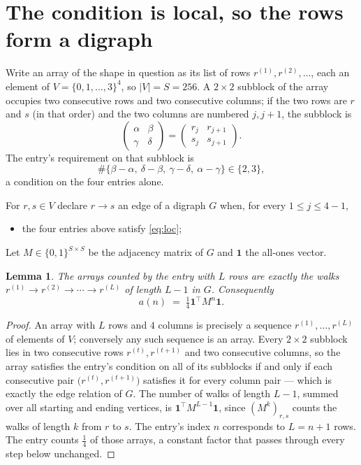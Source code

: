 \documentclass[11pt,a4paper]{article}
\theoremstyle{plain}
\newtheorem{lemma}[theorem]{Lemma}
\theoremstyle{definition}
\begin{document}
\section{The condition is local, so the rows form a digraph}

Write an array of the shape in question as its list of rows
$r^{(1)},r^{(2)},\dots$, each an element of
$V=\{0,1,\dots,3\}^{4}$, so $|V|=S=256$. A $2\times2$ subblock of the array
occupies two consecutive rows and two consecutive columns; if the two rows are $r$
and $s$ (in that order) and the two columns are numbered $j,j+1$,
the subblock is
\[
\begin{pmatrix}\alpha&\beta\\\gamma&\delta\end{pmatrix}=\begin{pmatrix}r_j&r_{j+1}\\s_j&s_{j+1}\end{pmatrix}.
\]
The entry's requirement on that subblock is
\begin{equation}\label{eq:loc}
\#\{\beta-\alpha,\ \delta-\beta,\ \gamma-\delta,\ \alpha-\gamma\}\in\{2,3\},
\end{equation}
a condition on the four entries alone.

For $r,s\in V$ declare $r\to s$ an edge of a digraph $G$ when, for every
$1\le j\le 4-1$,
\begin{itemize}
\item the four entries above satisfy \eqref{eq:loc};

\end{itemize}
Let $M\in\{0,1\}^{S\times S}$ be the adjacency matrix of $G$ and $\mathbf{1}$ the
all-ones vector.

\begin{lemma}\label{lem:walk}
The arrays counted by the entry with $L$ rows are exactly the walks
$r^{(1)}\to r^{(2)}\to\cdots\to r^{(L)}$ of length $L-1$ in $G$. Consequently
\[
a(n)\;=\;\tfrac1{4}\mathbf{1}^{\!\top}M^{n}\mathbf{1} .
\]
\end{lemma}

\begin{proof}
An array with $L$ rows and $4$ columns is precisely a sequence
$r^{(1)},\dots,r^{(L)}$ of elements of $V$; conversely any such sequence is an array.
Every $2\times2$ subblock lies in two consecutive rows $r^{(t)},r^{(t+1)}$ and two
consecutive columns, so the array satisfies the entry's condition on all of its subblocks
if and only if each consecutive pair $\bigl(r^{(t)},r^{(t+1)}\bigr)$ satisfies it for
every column pair --- which is exactly the edge relation of $G$. The number of walks of
length $L-1$, summed over all starting and ending vertices, is
$\mathbf{1}^{\!\top}M^{L-1}\mathbf{1}$, since $(M^{k})_{r,s}$ counts the walks of
length $k$ from $r$ to $s$. The entry's index $n$ corresponds to $L=n+1$ rows. The entry counts $\tfrac1{4}$ of those arrays, a constant factor that passes through every step below unchanged.
\end{proof}
\end{document}
